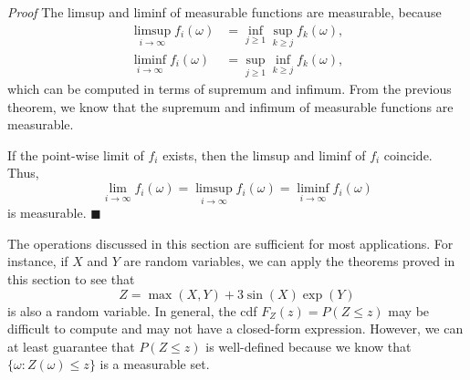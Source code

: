 \noindent\textit{Proof} The limsup and liminf of measurable functions are measurable, because
\begin{align*}
\limsup_{i \to \infty} f_i(\omega) &= \inf_{j \ge 1} \sup_{k \ge j} f_k(\omega), \\
\liminf_{i \to \infty} f_i(\omega) &= \sup_{j \ge 1} \inf_{k \ge j} f_k(\omega),
\end{align*}
which can be computed in terms of supremum and infimum. From the previous theorem, we know that the supremum and infimum of measurable functions are measurable.

If the point-wise limit of $f_i$ exists, then the limsup and liminf of $f_i$ coincide. Thus,
\[
\lim_{i \to \infty} f_i(\omega) = \limsup_{i \to \infty} f_i(\omega) = \liminf_{i \to \infty} f_i(\omega)
\]
is measurable. \hfill $\blacksquare$

The operations discussed in this section are sufficient for most applications. For instance, if $X$ and $Y$ are random variables, we can apply the theorems proved in this section to see that
\[
Z = \max(X, Y) + 3 \sin(X) \exp(Y)
\]
is also a random variable. In general, the cdf $F_Z(z) = P(Z \le z)$ may be difficult to compute and may not have a closed-form expression. However, we can at least guarantee that $P(Z \le z)$ is well-defined because we know that $\{\omega : Z(\omega) \le z\}$ is a measurable set.